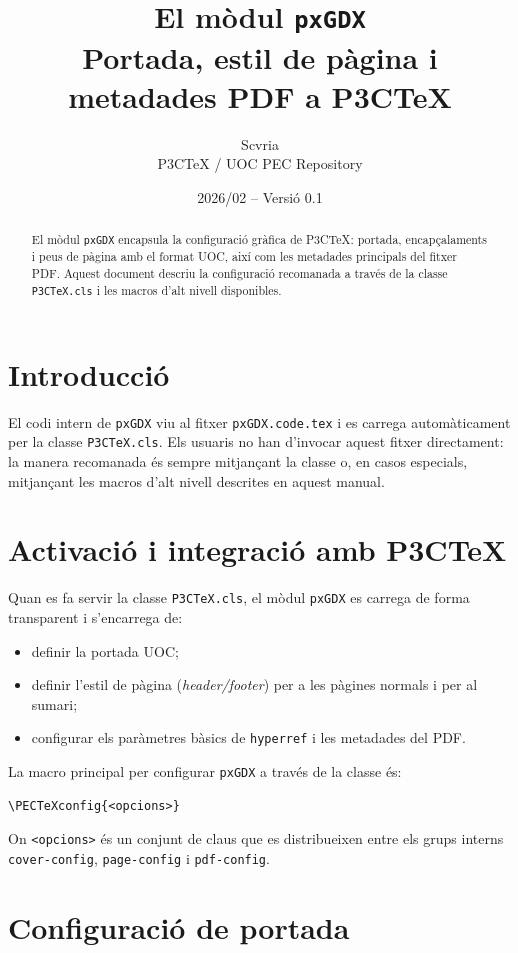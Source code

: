 \documentclass[11pt,a4paper]{article}
\title{El mòdul \texttt{pxGDX}\\
  \large Portada, estil de pàgina i metadades PDF a P3CTeX}
\author{Scvria\\P3CTeX / UOC PEC Repository}
\date{2026/02 -- Versió 0.1}
\begin{document}
\maketitle
\begin{abstract}
  El mòdul \texttt{pxGDX} encapsula la configuració gràfica de P3CTeX:
  portada, encapçalaments i peus de pàgina amb el format UOC, així com
  les metadades principals del fitxer PDF. Aquest document descriu la
  configuració recomanada a través de la classe \texttt{P3CTeX.cls} i
  les macros d'alt nivell disponibles.
\end{abstract}
\tableofcontents

\section{Introducció}

El codi intern de \texttt{pxGDX} viu al fitxer \verb|pxGDX.code.tex| i
es carrega automàticament per la classe \verb|P3CTeX.cls|. Els usuaris
no han d'invocar aquest fitxer directament: la manera recomanada és
sempre mitjançant la classe o, en casos especials, mitjançant les
macros d'alt nivell descrites en aquest manual.


\section{Activació i integració amb P3CTeX}

Quan es fa servir la classe \verb|P3CTeX.cls|, el mòdul \texttt{pxGDX}
es carrega de forma transparent i s'encarrega de:
\begin{itemize}
  \item definir la portada UOC;
  \item definir l'estil de pàgina (\emph{header/footer}) per a les
        pàgines normals i per al sumari;
  \item configurar els paràmetres bàsics de \texttt{hyperref} i les
        metadades del PDF.
\end{itemize}

La macro principal per configurar \texttt{pxGDX} a través de la classe
és:
\begin{verbatim}
\PECTeXconfig{<opcions>}
\end{verbatim}

On \verb|<opcions>| és un conjunt de claus que es distribueixen entre
els grups interns \verb|cover-config|, \verb|page-config| i
\verb|pdf-config|.

\section{Configuració de portada}
\end{document}
